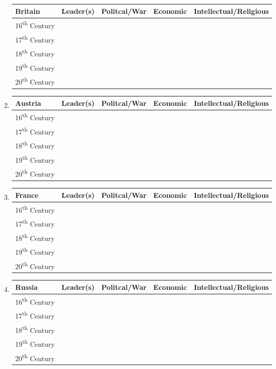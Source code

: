 \documentclass[12pt]{article}
\begin{document}
\begin{enumerate}
\begin{tabular}{l c c c c}
Britain & Leader(s) & Politcal/War & Economic & Intellectual/Religious \\
\hline
16\textsuperscript{th} Century & & & & \\
\hline
17\textsuperscript{th} Century & & & & \\
\hline
18\textsuperscript{th} Century & & & & \\
\hline
19\textsuperscript{th} Century & & & & \\
\hline
20\textsuperscript{th} Century & & & & \\

\end{tabular}

\item \begin{tabular}{l c c c c}

Austria & Leader(s) & Politcal/War & Economic & Intellectual/Religious \\
\hline
16\textsuperscript{th} Century & & & & \\
\hline
17\textsuperscript{th} Century & & & & \\
\hline
18\textsuperscript{th} Century & & & & \\
\hline
19\textsuperscript{th} Century & & & & \\
\hline
20\textsuperscript{th} Century & & & & \\

\end{tabular}

\item \begin{tabular}{l c c c c}

France & Leader(s) & Politcal/War & Economic & Intellectual/Religious \\
\hline
16\textsuperscript{th} Century & & & & \\
\hline
17\textsuperscript{th} Century & & & & \\
\hline
18\textsuperscript{th} Century & & & & \\
\hline
19\textsuperscript{th} Century & & & & \\
\hline
20\textsuperscript{th} Century & & & & \\

\end{tabular}

\item \begin{tabular}{l c c c c}

Russia & Leader(s) & Politcal/War & Economic & Intellectual/Religious \\
\hline
16\textsuperscript{th} Century & & & & \\
\hline
17\textsuperscript{th} Century & & & & \\
\hline
18\textsuperscript{th} Century & & & & \\
\hline
19\textsuperscript{th} Century & & & & \\
\hline
20\textsuperscript{th} Century & & & & \\


\end{tabular}
\end{enumerate}
\end{document}
